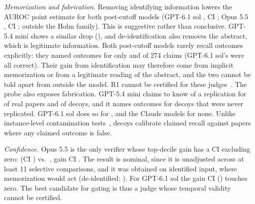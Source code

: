\documentclass[conference]{IEEEtran}
\begin{document}
\emph{Memorization and fabrication.} Removing identifying information lowers the AUROC point estimate for both post-cutoff models (GPT-6.1 sol \llmSolIdDeid{}, CI \llmSolIdDeidCi{}; Opus 5.5 \llmOpusIdDeid{}, CI \llmOpusIdDeidCi{}; outside the Holm family). This is suggestive rather than conclusive. GPT-5.4 mini shows a similar drop (\llmMiniIdDeid{}), and de-identification also removes the abstract, which is legitimate information. Both post-cutoff models rarely recall outcomes explicitly: they named outcomes for only \llmSolNamed{} and \llmOpusNamed{} of 274 claims (GPT-6.1 sol's were all correct). Their gain from identification may therefore come from implicit memorization or from a legitimate reading of the abstract, and the two cannot be told apart from outside the model. R1 cannot be certified for these judges~\cite{paleka2026pitfalls}. The probe also exposes fabrication. GPT-5.4 mini claims to know of a replication for \llmMiniAwareReal{} of real papers and \llmMiniAwareDecoy{} of decoys, and it names outcomes for \llmMiniNamedDecoy{} decoys that were never replicated. GPT-6.1 sol does so for \llmSolNamedDecoy{}, and the Claude models for none. Unlike instance-level contamination tests~\cite{golchin2024}, decoys calibrate claimed recall against papers where any claimed outcome is false.

\emph{Confidence.} Opus 5.5 is the only verifier whose top-decile gain has a CI excluding zero: \llmOpusIdTop{} (CI \llmOpusIdTopCi{}) vs.\ \llmOpusIdAll{}, gain CI \llmOpusIdGainCi{}. The result is nominal, since it is unadjusted across at least 11 selective comparisons, and it was obtained on identified input, where memorization would act (de-identified: \llmOpusDeidTop{}). For GPT-6.1 sol the gain CI (\llmSolIdGainCi{}) touches zero. The best candidate for gating is thus a judge whose temporal validity cannot be certified.


\end{document}
